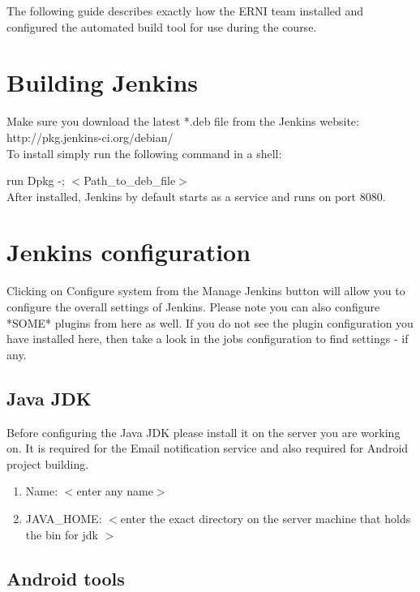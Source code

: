 The following guide describes exactly how the ERNI team installed and configured the automated build tool for use during the course. 

\section{Building Jenkins}
\label{jenkins}
Make sure you download the latest *.deb file from the Jenkins website:\\

http://pkg.jenkins-ci.org/debian/\\

To install simply run the following command in a shell:

run Dpkg -; $<$Path\_to\_deb\_file$>$\\

After installed, Jenkins by default starts as a service and runs on port 8080.\\

\section{Jenkins configuration}

Clicking on Configure system  from the Manage Jenkins button will allow you to configure the overall settings of Jenkins. Please note you can also configure *SOME* plugins from here as well. If you do not see the plugin configuration you have installed here, then take a look in the jobs configuration to find settings - if any. 

\subsection {Java JDK}

Before configuring the Java JDK please install it on the server you are working on.
It is required for the Email notification service and also required for Android project building.
\begin{enumerate}
\item Name: $<$enter any name$>$
\item JAVA\_HOME: $<$enter the exact directory on the server machine that holds the bin for jdk $>$ 
\end{enumerate}

\subsection {Android tools}

